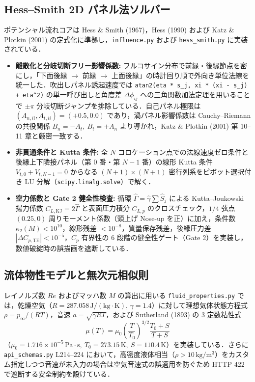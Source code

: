 \documentclass[10pt,a4paper]{article}
\begin{document}
\subsection{Hess--Smith 2D パネル法ソルバー}
ポテンシャル流れコアは Hess \& Smith (1967)，Hess (1990) および Katz \& Plotkin (2001) の定式化に準拠し，\texttt{influence.py} および \texttt{hess\_smith.py} に実装されている．
\begin{itemize}\setlength{\itemsep}{2pt}\setlength{\parskip}{0pt}
  \item \textbf{離散化と分岐切断フリー影響係数:} フルコサイン分布で前縁・後縁節点を密にし，「下面後縁 $\to$ 前縁 $\to$ 上面後縁」の時計回り順で外向き単位法線を統一した．吹出しパネル誘起速度では \texttt{atan2(eta * s\_j, xi * (xi - s\_j) + eta\string^2)} の単一呼び出しと角度差 $\Delta\phi_{ij}$ への三角関数加法定理を用いることで $\pm\pi$ 分岐切断ジャンプを排除している．自己パネル極限は $(A_{n,ii}, A_{t,ii}) = (+0.5, 0.0)$ であり，渦パネル影響係数は Cauchy--Riemann の共役関係 $B_n = -A_t,\ B_t = +A_n$ より導かれ，Katz \& Plotkin (2001) 第 10--11 章と厳密一致する．
  \item \textbf{非貫通条件と Kutta 条件:} 全 $N$ コロケーション点での法線速度ゼロ条件と後縁上下隣接パネル（第 $0$ 番・第 $N-1$ 番）の線形 Kutta 条件 $V_{t,0} + V_{t,N-1} = 0$ からなる $(N+1)\times(N+1)$ 密行列系をピボット選択付き LU 分解（\texttt{scipy.linalg.solve}）で解く．
  \item \textbf{空力係数と Gate 2 健全性検査:} 循環 $\hat{\Gamma} = \hat{\gamma}\sum \hat{S}_j$ による Kutta--Joukowski 揚力係数 $C_{L,\mathrm{KJ}} = 2\hat{\Gamma}$ と表面圧力積分 $C_{L,p}$ のクロスチェック，$1/4$ 弦点 $(0.25, 0)$ 周りモーメント係数（頭上げ Nose-up を正）に加え，条件数 $\kappa_2(M)<10^{10}$，線形残差 $<10^{-8}$，質量保存残差，後縁圧力差 $|\Delta C_{p,\mathrm{TE}}|<10^{-5}$，$C_p$ 有界性の 6 段階の健全性ゲート（Gate 2）を実装し，数値破綻時の誤描画を遮断している．
\end{itemize}

\subsection{流体物性モデルと無次元相似則}
レイノルズ数 $Re$ およびマッハ数 $M$ の算出に用いる \texttt{fluid\_properties.py} では，乾燥空気（$R = 287.058\,\mathrm{J/(kg\cdot K)}$, $\gamma = 1.4$）に対して理想気体状態方程式 $\rho = p_\infty/(RT)$，音速 $a = \sqrt{\gamma RT}$，および Sutherland (1893) の 3 定数粘性式
\begin{equation}
  \mu(T) = \mu_0 \left(\frac{T}{T_0}\right)^{3/2} \frac{T_0 + S}{T + S}
\end{equation}
（$\mu_0 = 1.716\times 10^{-5}\,\mathrm{Pa\cdot s},\ T_0 = 273.15\,\mathrm{K},\ S = 110.4\,\mathrm{K}$）を実装している．さらに \texttt{api\_schemas.py} L214--224 において，高密度液体相当（$\rho > 10\,\mathrm{kg/m^3}$）をカスタム指定しつつ音速が未入力の場合は空気音速式の誤適用を防ぐため HTTP 422 で遮断する安全制約を設けている．
\end{document}
